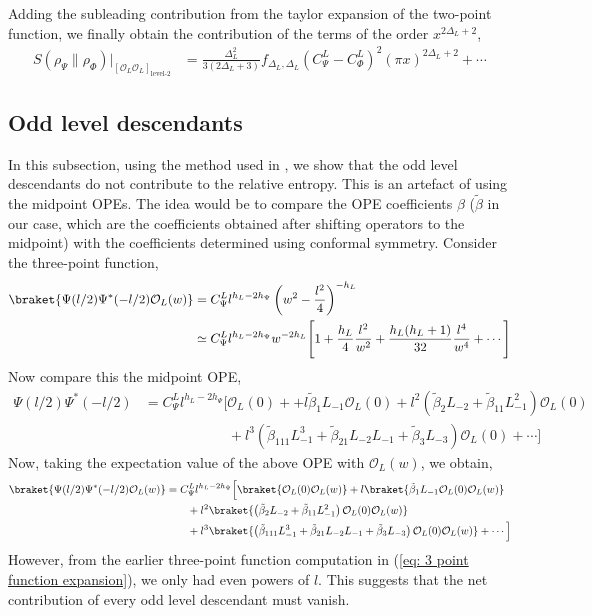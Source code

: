 \documentclass[11pt]{article}
\newcommand{\mO}{\mathcal{O}}
\newcommand{\nn}{\nonumber}
\newcommand{\lb}{\left(}
\newcommand{\rb}{\right)}
\begin{document}
Adding the subleading contribution from the taylor expansion of the two-point function, we finally obtain the contribution of the terms of the order $x^{2\Delta_L+ 2}$, 
\begin{align}
    S(\rho_\Psi \|\rho_\Phi)\Big|_{[\mO_L\mO_L]_{\text{level-2}}}&= \frac{\Delta_L^2}{3(2\Delta_L +3)}f_{\Delta_L,\Delta_L} (C_\Psi^L - C_\Phi^L)^2(\pi x)^{2\Delta_L + 2} + \cdots
\end{align}
\subsection{Odd level descendants}
In this subsection, using the method used in \cite{yellowbook}, we show that the odd level descendants do not contribute to the relative entropy. This is an artefact of using the midpoint OPEs. The idea would be to compare the OPE coefficients $\beta$ ($\tilde\beta$ in our case, which are the coefficients obtained after shifting operators to the midpoint) with the coefficients determined using conformal symmetry. Consider the three-point function,
\begin{align}
    \braket{\Psi(l/2) \Psi^*(-l/2) \mO_L(w)} &= C_{\Psi}^Ll^{h_L-2h_\Psi} \lb w^2 - \frac{l^2}{4}\rb^{-h_L}\\
    &\simeq C_{\Psi}^L l^{h_L-2h_\Psi}w^{-2h_L}\Bigg[ 1+ \frac{h_L}{4}\frac{l^2}{w^2} + \frac{h_L (h_L+1)}{32}\frac{l^4}{w^4}  + \cdots \Bigg]\label{eq: 3 point function expansion}
\end{align}
Now compare this the midpoint OPE,
\begin{align}
    \Psi(l/2) \Psi^*(-l/2) &= C_{\Psi}^Ll^{h_L-2h_\Psi} \Big[ \mO_L(0) + + l\tilde\beta_1 L_{-1}\mO_L(0) + l^2 \lb \tilde\beta_2L_{-2}+ \tilde \beta_{11}L_{-1}^2\rb\mO_L(0) \nn \\ &\qquad\qquad\qquad+ l^3\lb \tilde \beta_{111}L_{-1}^3 + \tilde \beta_{21}L_{-2}L_{-1} +  \tilde \beta _{3}L_{-3} \rb\mO_L(0) +\cdots \Big]
\end{align}
Now, taking the expectation value of the above OPE with $\mO_L(w)$, we obtain,
\begin{align}
    \braket{\Psi(l/2) \Psi^*(-l/2) \mO_L(w)} &= C_{\Psi}^Ll^{h_L-2h_\Psi} \Big[ \braket{\mO_L(0)\mO_L(w)} + l\braket{\tilde \beta_1 L_{-1}\mO_L(0)\mO_L(w)} \nn \\
    &\qquad+ l^2 \braket{\lb \tilde\beta_2L_{-2}+ \tilde \beta_{11}L_{-1}^2\rb\mO_L(0)\mO_L(w)} \nn \\ &\qquad+ l^3\braket{\lb \tilde \beta_{111}L_{-1}^3 + \tilde \beta_{21}L_{-2}L_{-1} +  \tilde \beta _{3}L_{-3} \rb\mO_L(0)\mO_L(w)} + \cdots  \Big]
\end{align}
However, from the earlier three-point function computation in (\ref{eq: 3 point function expansion}), we only had even powers of $l$. This suggests that the net contribution of every odd level descendant must vanish. 
\end{document}
